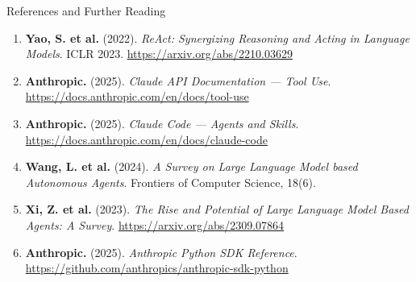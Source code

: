 \documentclass[aspectratio=169,xcolor=dvipsnames]{beamer}
\begin{document}
\begin{frame}{References and Further Reading}
    \begin{enumerate}
        \item \textbf{Yao, S. et al.} (2022). \textit{ReAct: Synergizing Reasoning and Acting in Language Models}. ICLR 2023. \url{https://arxiv.org/abs/2210.03629}

        \item \textbf{Anthropic.} (2025). \textit{Claude API Documentation --- Tool Use}. \url{https://docs.anthropic.com/en/docs/tool-use}

        \item \textbf{Anthropic.} (2025). \textit{Claude Code --- Agents and Skills}. \url{https://docs.anthropic.com/en/docs/claude-code}

        \item \textbf{Wang, L. et al.} (2024). \textit{A Survey on Large Language Model based Autonomous Agents}. Frontiers of Computer Science, 18(6).

        \item \textbf{Xi, Z. et al.} (2023). \textit{The Rise and Potential of Large Language Model Based Agents: A Survey}. \url{https://arxiv.org/abs/2309.07864}

        \item \textbf{Anthropic.} (2025). \textit{Anthropic Python SDK Reference}. \url{https://github.com/anthropics/anthropic-sdk-python}
    \end{enumerate}
\end{frame}

\end{document}
